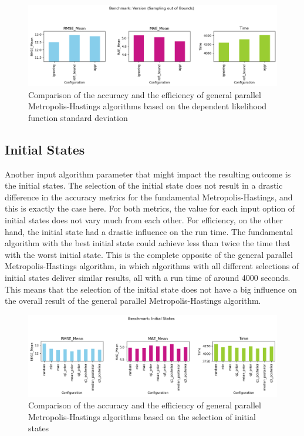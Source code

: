 \begin{figure}[H]
    \centering
    \includegraphics[width=1\textwidth]{figures/gpmh/sotb.png}
    \captionsetup{width=.8\textwidth}
    \caption{Comparison of the accuracy and the efficiency of general parallel Metropolis-Hastings algorithms based on the dependent likelihood function standard deviation}
    \label{fig:enter-label}
\end{figure}

\subsection{Initial States}
Another input algorithm parameter that might impact the resulting outcome is the initial states. The selection of the initial state does not result in a drastic difference in the accuracy metrics for the fundamental Metropolis-Hastings, and this is exactly the case here. For both metrics, the value for each input option of initial states does not vary much from each other. For efficiency, on the other hand, the initial state had a drastic influence on the run time. The fundamental algorithm with the best initial state could achieve less than twice the time that with the worst initial state. This is the complete opposite of the general parallel Metropolis-Hastings algorithm, in which algorithms with all different selections of initial states deliver similar results, all with a run time of around 4000 seconds. This means that the selection of the initial state does not have a big influence on the overall result of the general parallel Metropolis-Hastings algorithm. 

\begin{figure}[H]
    \centering
    \includegraphics[width=1\textwidth]{figures/gpmh/init_states.png}
    \captionsetup{width=.8\textwidth}
    \caption{Comparison of the accuracy and the efficiency of general parallel Metropolis-Hastings algorithms based on the selection of initial states}
    \label{fig:enter-label}
\end{figure}

